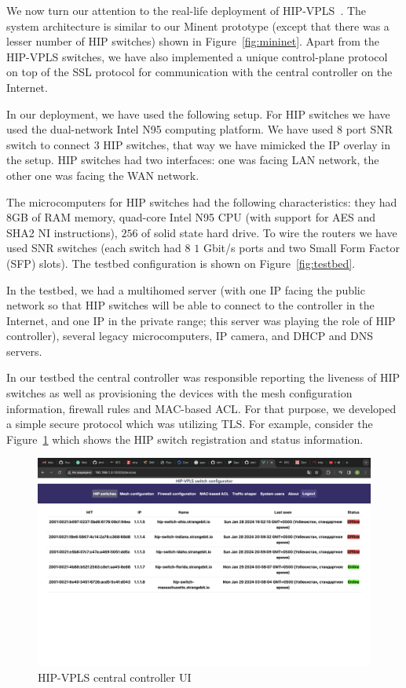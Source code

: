 We now turn our attention to the real-life deployment 
of HIP-VPLS~\cite{hipvpls-hw, hipvpls-controller}. The system architecture is similar to our Minent prototype
(except that there was a lesser number of HIP switches) shown in Figure~\ref{fig:mininet}. 
Apart from the HIP-VPLS switches, we have also implemented a unique 
control-plane protocol on top of the SSL protocol for communication 
with the central controller on the Internet.

In our deployment, we have used the following setup. For HIP switches we 
have used the dual-network Intel N95 computing platform. We have used $8$ 
port SNR switch to connect $3$ HIP switches, that way we have mimicked the 
IP overlay in the setup. HIP switches had two interfaces: one was facing 
LAN network, the other one was facing the WAN network. 

The microcomputers for HIP switches had the following characteristics: they had $8$GB of RAM memory, 
quad-core Intel N95 CPU (with support for AES and SHA2 NI instructions), $256$ of 
solid state hard drive. To wire the routers we have used SNR switches 
(each switch had $8$ $1$ Gbit/s ports and two Small Form Factor (SFP) slots). 
The testbed configuration is shown on Figure~\ref{fig:testbed}.

In the testbed, we had a multihomed server (with one IP facing 
the public network so that HIP switches will be able to connect to 
the controller in the Internet, and one IP in the private range; this server
was playing the role of HIP controller), several legacy microcomputers, 
IP camera, and DHCP and DNS servers.

In our testbed the central controller was responsible 
reporting the liveness of HIP switches as well as provisioning 
the devices with the mesh configuration information, firewall rules 
and MAC-based ACL. For that purpose, we developed a simple 
secure protocol which was utilizing TLS. For example, consider 
the Figure~\ref{devices} which shows the HIP switch registration
and status information.

\begin{figure}[h!]
    \centering
    \includegraphics[width=1\textwidth]{graphics/devices.png}
    \caption{HIP-VPLS central controller UI}
    \label{devices}
\end{figure}

